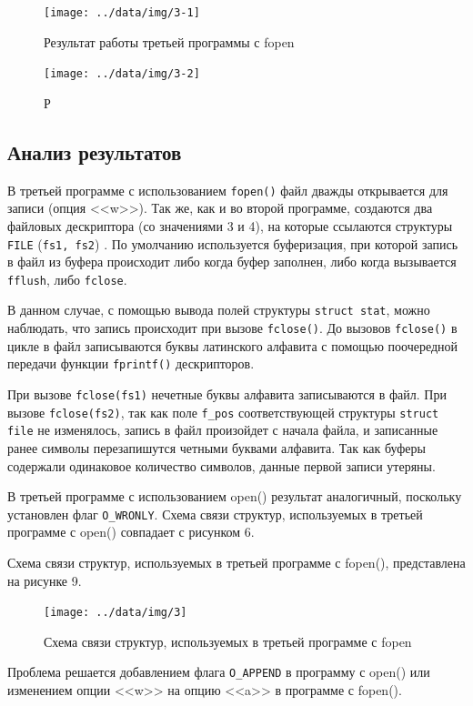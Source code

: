 \begin{figure}[ht]
	\centering
	\texttt{[image: ../data/img/3-1]}
	\caption{Результат работы третьей программы с fopen}
\end{figure}\newpage

\captionsetup{singlelinecheck = false, justification=raggedright}


\captionsetup{singlelinecheck = false, justification=raggedright}


\begin{figure}[ht]
	\centering
	\texttt{[image: ../data/img/3-2]}
	\caption{Р}
\end{figure}

\subsection{Анализ результатов}

В третьей программе с использованием \texttt{fopen()} файл дважды открывается для записи (опция <<w>>). Так же, как и во второй программе,
создаются два файловых дескриптора (со значениями 3 и 4), на которые
ссылаются структуры \texttt{FILE} (\texttt{fs1, fs2}) . По умолчанию используется
буферизация, при которой запись в файл из буфера происходит либо когда буфер
заполнен, либо когда вызывается \texttt{fflush}, либо
\texttt{fclose}.

В данном случае, с помощью вывода полей структуры \texttt{struct stat}, можно наблюдать, что запись происходит при вызове \texttt{fclose()}. До
вызовов \texttt{fclose()} в цикле в файл записываются буквы латинского
алфавита с помощью поочередной передачи функции \texttt{fprintf()} дескрипторов.

При вызове \texttt{fclose(fs1)} нечетные буквы алфавита записываются в файл.
При вызове \texttt{fclose(fs2)}, так как поле \texttt{f\_pos}
соответствующей структуры \texttt{struct file} не изменялось, запись в файл
произойдет с начала файла, и записанные ранее символы перезапишутся четными буквами алфавита.
Так как буферы содержали одинаковое количество символов, данные первой
записи утеряны.

В третьей программе с использованием open() результат аналогичный, поскольку установлен флаг \texttt{O\_WRONLY}. Схема связи структур, используемых в третьей программе с open() совпадает с рисунком 6.

Схема связи структур, используемых в третьей программе с fopen(), представлена на рисунке 9.

\begin{figure}[ht]
	\centering
	\texttt{[image: ../data/img/3]}
	\caption{Схема связи структур, используемых в третьей программе с fopen}
\end{figure}

Проблема решается добавлением флага \texttt{O\_APPEND} в программу с open() или изменением опции <<w>> на опцию <<a>> в программе с fopen().

